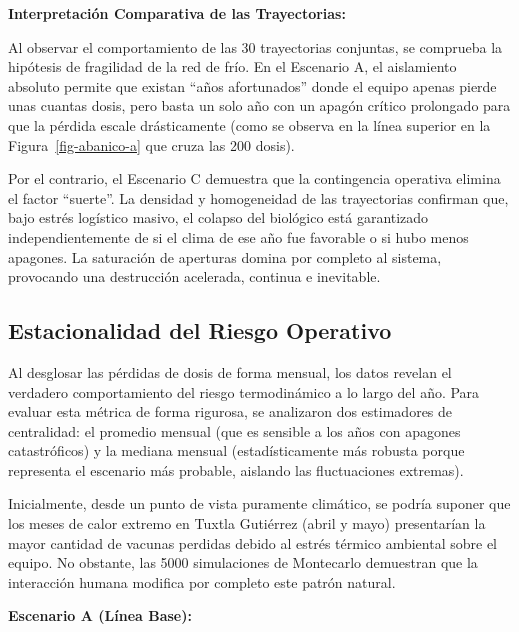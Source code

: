 \documentclass[
  spanish,
  letterpaper,
  DIV=11,
  numbers=noendperiod]{scrreprt}
\theoremstyle{plain}
\theoremstyle{plain}
\theoremstyle{plain}
\theoremstyle{definition}
\theoremstyle{remark}
\begin{document}
\textbf{Interpretación Comparativa de las Trayectorias:}

Al observar el comportamiento de las 30 trayectorias conjuntas, se
comprueba la hipótesis de fragilidad de la red de frío. En el Escenario
A, el aislamiento absoluto permite que existan ``años afortunados''
donde el equipo apenas pierde unas cuantas dosis, pero basta un solo año
con un apagón crítico prolongado para que la pérdida escale
drásticamente (como se observa en la línea superior en la
Figura~\ref{fig-abanico-a} que cruza las 200 dosis).

Por el contrario, el Escenario C demuestra que la contingencia operativa
elimina el factor ``suerte''. La densidad y homogeneidad de las
trayectorias confirman que, bajo estrés logístico masivo, el colapso del
biológico está garantizado independientemente de si el clima de ese año
fue favorable o si hubo menos apagones. La saturación de aperturas
domina por completo al sistema, provocando una destrucción acelerada,
continua e inevitable.

\subsection{Estacionalidad del Riesgo
Operativo}\label{estacionalidad-del-riesgo-operativo}

Al desglosar las pérdidas de dosis de forma mensual, los datos revelan
el verdadero comportamiento del riesgo termodinámico a lo largo del año.
Para evaluar esta métrica de forma rigurosa, se analizaron dos
estimadores de centralidad: el promedio mensual (que es sensible a los
años con apagones catastróficos) y la mediana mensual (estadísticamente
más robusta porque representa el escenario más probable, aislando las
fluctuaciones extremas).

Inicialmente, desde un punto de vista puramente climático, se podría
suponer que los meses de calor extremo en Tuxtla Gutiérrez (abril y
mayo) presentarían la mayor cantidad de vacunas perdidas debido al
estrés térmico ambiental sobre el equipo. No obstante, las 5000
simulaciones de Montecarlo demuestran que la interacción humana modifica
por completo este patrón natural.

\textbf{Escenario A (Línea Base):}
\end{document}
